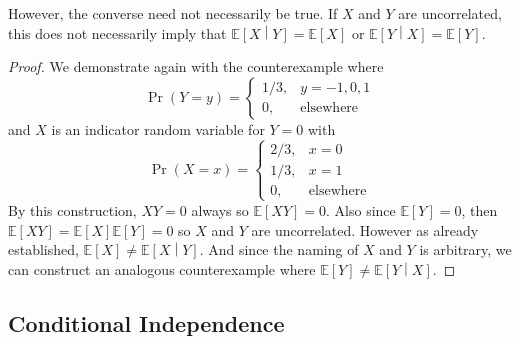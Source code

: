 \documentclass[11pt]{report} %
\begin{document}
However, the converse need not necessarily be true. If $X$ and $Y$ are uncorrelated, this does not necessarily imply that $\mathbb{E}\left[X\middle|Y\right] = \mathbb{E}\left[X\right]$ or $\mathbb{E}\left[Y\middle|X\right] = \mathbb{E}\left[Y\right]$.
\begin{proof}
We demonstrate again with the counterexample where
\begin{equation}
\operatorname{Pr}\left(Y = y\right) = \begin{cases} 1/3, & y = -1, 0, 1 \\ 0, & \mathrm{elsewhere}\end{cases}
\end{equation}
and $X$ is an indicator random variable for $Y = 0$ with
\begin{equation}
\operatorname{Pr}\left(X = x\right) = \begin{cases} 2/3, & x = 0 \\ 1/3, & x = 1 \\ 0, & \mathrm{elsewhere}\end{cases}
\end{equation}
By this construction, $XY = 0$ always so $\mathbb{E}\left[XY\right] = 0$. Also since $\mathbb{E}\left[Y\right] = 0$, then $\mathbb{E}\left[XY\right] = \mathbb{E}\left[X\right]\mathbb{E}\left[Y\right] = 0$ so $X$ and $Y$ are uncorrelated. However as already established, $\mathbb{E}\left[X\right] \neq \mathbb{E}\left[X \middle|Y\right]$. And since the naming of $X$ and $Y$ is arbitrary, we can construct an analogous counterexample where $\mathbb{E}\left[Y\right] \neq \mathbb{E}\left[Y \middle|X\right]$.
\end{proof}

\subsection{Conditional Independence}
\end{document}
